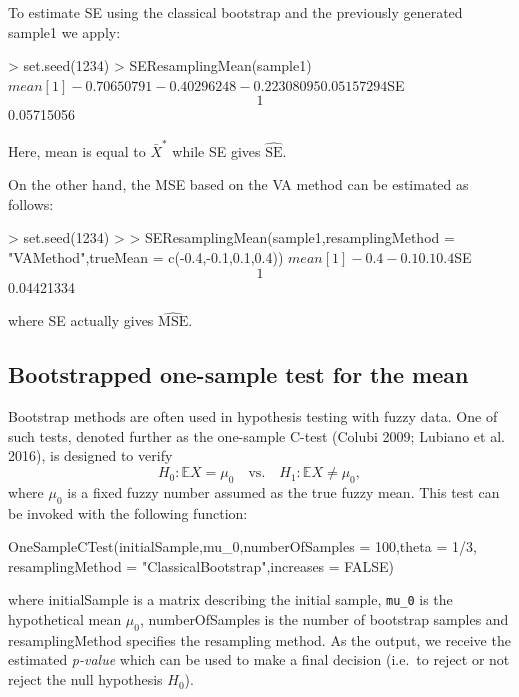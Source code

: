 To estimate SE using the classical bootstrap and the previously
generated sample1 we apply:

\begin{example}
\textgreater{} set.seed(1234) \textgreater{} SEResamplingMean(sample1) \(mean [1] -0.70650791 -0.40296248 -0.22308095 0.05157294\)SE \[1\] 0.05715056
\end{example}

Here, mean is equal to \(\bar{X}^{*}\) while SE gives
\(\widehat{\mathrm{SE}}\).

On the other hand, the MSE based on the VA method can be estimated as
follows:

\begin{example}
\textgreater{} set.seed(1234) \textgreater{} \textgreater{} SEResamplingMean(sample1,resamplingMethod =
"VAMethod",trueMean = c(-0.4,-0.1,0.1,0.4)) \(mean [1] -0.4 -0.1 0.1 0.4\)SE \[1\] 0.04421334
\end{example}

where SE actually gives \(\widehat{\mathrm{MSE}}\).

\hypertarget{bootstrapped-one-sample-test-for-the-mean}{%
\subsection{Bootstrapped one-sample test for the mean}\label{bootstrapped-one-sample-test-for-the-mean}}

Bootstrap methods are often used in hypothesis testing with fuzzy data.
One of such tests, denoted further as the one-sample C-test
(Colubi 2009; Lubiano et al. 2016), is designed to verify
\[\label{h0ctestw}
    H_0 : \mathbb{E} X = \mu_0 \quad\text{vs.}\quad H_1 : \mathbb{E} X \not = \mu_0 ,\]
where \(\mu_0\) is a fixed fuzzy number assumed as the true fuzzy mean.
This test can be invoked with the following function:

\begin{example}
OneSampleCTest(initialSample,mu\_0,numberOfSamples = 100,theta = 1/3,
resamplingMethod = "ClassicalBootstrap",increases = FALSE)
\end{example}

where initialSample is a matrix describing the initial sample, \texttt{mu\_0} is
the hypothetical mean \(\mu_0\), numberOfSamples is the number of
bootstrap samples and resamplingMethod specifies the resampling method.
As the output, we receive the estimated \emph{p-value} which can be used to
make a final decision (i.e.~to reject or not reject the null hypothesis
\(H_0\)).

